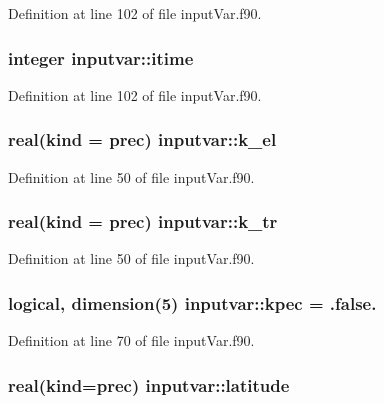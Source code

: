 Definition at line 102 of file input\-Var.\-f90.

\hypertarget{classinputvar_a06f760a3ae10a8b9834a7e0d270d1d59}{
\subsubsection[{itime}]{\setlength{\rightskip}{0pt plus 5cm}integer inputvar\-::itime}}\label{classinputvar_a06f760a3ae10a8b9834a7e0d270d1d59}


Definition at line 102 of file input\-Var.\-f90.

\hypertarget{classinputvar_a021273f9a287d8d4c9fcd0651bf17d8e}{
\subsubsection[{k\-\_\-el}]{\setlength{\rightskip}{0pt plus 5cm}real(kind = prec) inputvar\-::k\-\_\-el}}\label{classinputvar_a021273f9a287d8d4c9fcd0651bf17d8e}


Definition at line 50 of file input\-Var.\-f90.

\hypertarget{classinputvar_ad02af5c5e2d12134398545c12e832b9b}{
\subsubsection[{k\-\_\-tr}]{\setlength{\rightskip}{0pt plus 5cm}real(kind = prec) inputvar\-::k\-\_\-tr}}\label{classinputvar_ad02af5c5e2d12134398545c12e832b9b}


Definition at line 50 of file input\-Var.\-f90.

\hypertarget{classinputvar_a17bd2d4ef6c3b43e7b2d447f1fab021e}{
\subsubsection[{kpec}]{\setlength{\rightskip}{0pt plus 5cm}logical, dimension(5) inputvar\-::kpec = .false.}}\label{classinputvar_a17bd2d4ef6c3b43e7b2d447f1fab021e}


Definition at line 70 of file input\-Var.\-f90.

\hypertarget{classinputvar_aa7a4772c1f679371a4578409bd0e48c5}{
\subsubsection[{latitude}]{\setlength{\rightskip}{0pt plus 5cm}real(kind=prec) inputvar\-::latitude}}\label{classinputvar_aa7a4772c1f679371a4578409bd0e48c5}


